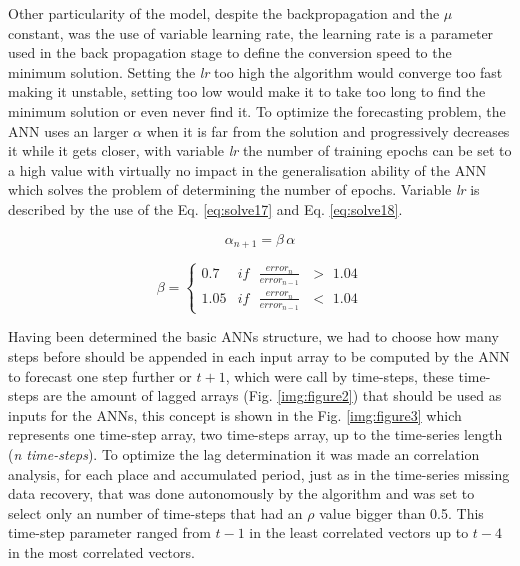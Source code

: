 Other particularity of the model, despite the backpropagation and the $\mu$ constant, was the use of variable learning rate, the learning rate is a parameter used in the back propagation stage to define the conversion speed to the minimum solution. Setting the \textit{lr} too high the algorithm would converge too fast making it unstable, setting too low would make it to take too long to find the minimum solution or even never find it. To optimize the forecasting problem, the ANN uses an larger $\alpha$ when it 
is far from the solution and progressively decreases it while it gets closer, with variable \textit{lr} the number of training epochs can be set to a high value with virtually no impact in the generalisation ability of the ANN which solves the problem of determining the number of epochs. Variable \textit{lr} is described by the use of the Eq. \ref{eq:solve17} and Eq. \ref{eq:solve18}.

\begin{equation}
\label{eq:solve17}
\alpha_{n + 1} = \beta \, \alpha
\end{equation}

\begin{equation}
\label{eq:solve18}
\beta = \begin{cases}
         0.7 & \text{$if$ $\frac{error_n}{error_{n-1}}$ $>$ 1.04}\\
         1.05 & \text{$if$ $\frac{error_n}{error_{n-1}}$ $<$ 1.04}
        \end{cases}
\end{equation}

Having been determined the basic ANNs structure, we had to choose how many steps before should be appended in each input array to be computed by the ANN to forecast one step further or $t + 1$,
which were call by time-steps, these time-steps are the amount of lagged arrays (Fig. \ref{img:figure2}) that should be used as inputs for the ANNs, this concept is shown in the Fig. \ref{img:figure3} which represents one time-step array,  two time-steps array, up to the time-series length (\textit{n time-steps}). To optimize the lag determination it was made an correlation analysis, for each place and accumulated period, just as in the time-series missing data recovery, that was done autonomously by the algorithm and was set to select only an number of time-steps that had an $\rho$  value bigger than 0.5. This time-step parameter ranged from $t-1$ in the least correlated vectors up to $t-4$ in the most correlated vectors.

